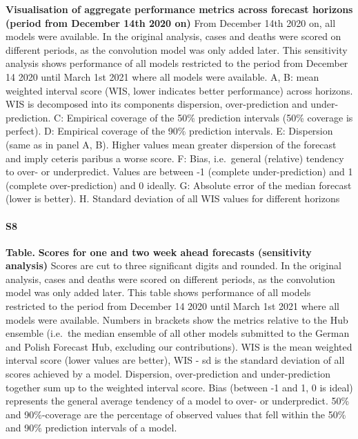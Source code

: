 \documentclass[10pt,letterpaper]{article}
\begin{document}
\textbf{Visualisation of aggregate performance metrics across forecast horizons (period from December 14th 2020 on)}
From December 14th 2020 on, all models were available. In the original
analysis, cases and deaths were scored on different periods, as the
convolution model was only added later. This sensitivity analysis shows
performance of all models restricted to the period from December 14 2020
until March 1st 2021 where all models were available. A, B: mean
weighted interval score (WIS, lower indicates better performance) across
horizons. WIS is decomposed into its components dispersion,
over-prediction and under-prediction. C: Empirical coverage of the 50\%
prediction intervals (50\% coverage is perfect). D: Empirical coverage
of the 90\% prediction intervals. E: Dispersion (same as in panel A, B).
Higher values mean greater dispersion of the forecast and imply ceteris
paribus a worse score. F: Bias, i.e.~general (relative) tendency to
over- or underpredict. Values are between -1 (complete under-prediction)
and 1 (complete over-prediction) and 0 ideally. G: Absolute error of the
median forecast (lower is better). H. Standard deviation of all WIS
values for different horizons

\paragraph{S8}

\textbf{Table.} \label{tab:score-table-late-2}
\textbf{Scores for one and two week ahead forecasts (sensitivity analysis)}
Scores are cut to three significant digits and rounded. In the original
analysis, cases and deaths were scored on different periods, as the
convolution model was only added later. This table shows performance of
all models restricted to the period from December 14 2020 until March
1st 2021 where all models were available. Numbers in brackets show the
metrics relative to the Hub ensemble (i.e.~the median ensemble of all
other models submitted to the German and Polish Forecast Hub, excluding
our contributions). WIS is the mean weighted interval score (lower
values are better), WIS - sd is the standard deviation of all scores
achieved by a model. Dispersion, over-prediction and under-prediction
together sum up to the weighted interval score. Bias (between -1 and 1,
0 is ideal) represents the general average tendency of a model to over-
or underpredict. 50\% and 90\%-coverage are the percentage of observed
values that fell within the 50\% and 90\% prediction intervals of a
model.
\end{document}
